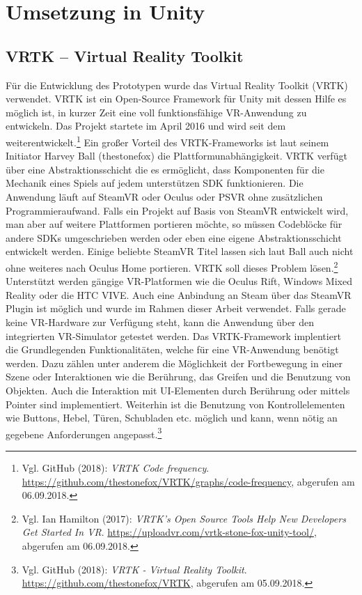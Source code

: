 \chapter{Umsetzung in Unity}

\section{VRTK -- Virtual Reality Toolkit}
\label{sec:VRTK-VirtualRealityToolkit}

Für die Entwicklung des Prototypen wurde das  Virtual Reality Toolkit (VRTK) verwendet. VRTK ist ein Open-Source Framework für Unity mit dessen Hilfe es möglich ist, in kurzer Zeit eine voll funktionsfähige VR-Anwendung zu entwickeln. Das Projekt startete im April 2016 und wird seit dem weiterentwickelt.\footnote{Vgl. GitHub (2018): \textit{VRTK Code frequency}.\newline
\url{https://github.com/thestonefox/VRTK/graphs/code-frequency},\newline 
abgerufen am 06.09.2018.} 
Ein großer Vorteil des VRTK-Frameworks ist laut seinem Initiator Harvey Ball (thestonefox) die Plattformunabhängigkeit. VRTK verfügt über eine Abstraktionsschicht die es ermöglicht, dass Komponenten für die Mechanik eines Spiels auf jedem unterstützen SDK funktionieren. Die Anwendung läuft auf SteamVR oder Oculus oder PSVR ohne zusätzlichen Programmieraufwand. Falls ein Projekt auf Basis von SteamVR entwickelt wird, man aber auf weitere Plattformen portieren möchte, so müssen Codeblöcke für andere SDKs umgeschrieben werden oder eben eine eigene Abstraktionsschicht entwickelt werden. Einige beliebte SteamVR Titel lassen sich laut Ball auch nicht ohne weiteres nach Oculus Home portieren. VRTK soll dieses Problem lösen.\footnote{Vgl. Ian Hamilton (2017): \textit{VRTK’s Open Source Tools Help New Developers Get Started In VR}.\newline
\url{https://uploadvr.com/vrtk-stone-fox-unity-tool/},\newline 
abgerufen am 06.09.2018.}
Unterstützt werden gängige VR-Platformen wie die Oculus Rift, Windows Mixed Reality oder die HTC VIVE. Auch eine Anbindung an Steam über das SteamVR Plugin ist möglich und wurde im Rahmen dieser Arbeit verwendet. Falls gerade keine VR-Hardware zur Verfügung steht, kann die Anwendung über den integrierten VR-Simulator getestet werden. 
Das VRTK-Framework implentiert die Grundlegenden Funktionalitäten, welche für eine VR-Anwendung benötigt werden. Dazu zählen unter anderem die Möglichkeit der Fortbewegung in einer Szene oder Interaktionen wie die Berührung, das Greifen und die Benutzung von Objekten.  Auch die Interaktion mit UI-Elementen durch Berührung oder mittels Pointer sind implementiert. Weiterhin ist die Benutzung von Kontrollelementen wie Buttons, Hebel, Türen, Schubladen etc. möglich und kann, wenn nötig an gegebene Anforderungen angepasst.\footnote{Vgl. GitHub (2018): \textit{VRTK - Virtual Reality Toolkit}.\newline
\url{https://github.com/thestonefox/VRTK},\newline 
abgerufen am 05.09.2018.}

